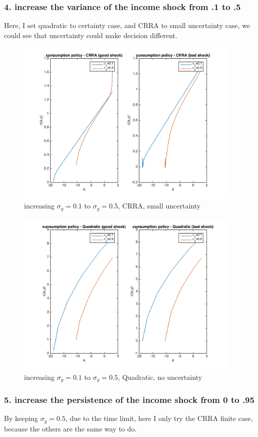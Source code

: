 \documentclass{article}[a4paper]
\begin{document}
\subsubsection{4. increase the variance of the income shock from .1 to .5}
Here, I set quadratic to certainty case, and CRRA to small uncertainty case, we could see that uncertainty could make decision different.

\begin{figure}[htbp]
\centering
\includegraphics[width=\textwidth,height=8cm]{img/423.png}
\caption{increasing $\sigma_y = 0.1$ to $\sigma_y = 0.5$, CRRA, small uncertainty}
\end{figure}

\begin{figure}[htbp]
\centering
\includegraphics[width=\textwidth,height=8cm]{img/423-q.png}
\caption{increasing $\sigma_y = 0.1$ to $\sigma_y = 0.5$, Quadratic, no uncertainty}
\end{figure}

\subsubsection{5. increase the persistence of the income shock from 0 to .95}
By keeping $\sigma_y=0.5$, due to the time limit, here I only try the CRRA finite case, because the others are the same way to do.
\end{document}
